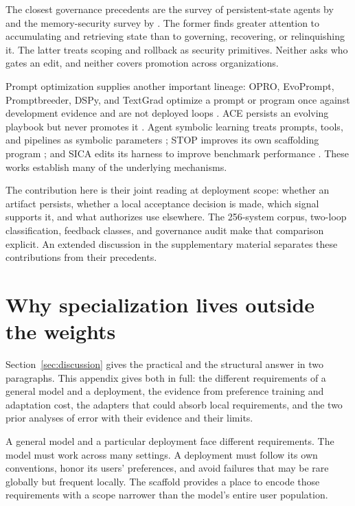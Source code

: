 The closest governance precedents are the survey of persistent-state agents by \citet{ding2026alwayson} and the memory-security survey by \citet{lin2026memorysecurity}. The former finds greater attention to accumulating and retrieving state than to governing, recovering, or relinquishing it. The latter treats scoping and rollback as security primitives. Neither asks who gates an edit, and neither covers promotion across organizations.

Prompt optimization supplies another important lineage: OPRO, EvoPrompt, Promptbreeder, DSPy, and TextGrad optimize a prompt or program once against development evidence and are not deployed loops \citep{yang2023opro, guo2023evoprompt, fernando2023promptbreeder, khattab2023dspy, yuksekgonul2024textgrad}. ACE persists an evolving playbook but never promotes it \citep{ace2025agentic}. Agent symbolic learning treats prompts, tools, and pipelines as symbolic parameters \citep{zhou2024symbolic}; STOP improves its own scaffolding program \citep{zelikman2023stop}; and SICA edits its harness to improve benchmark performance \citep{robeyns2025sica}. These works establish many of the underlying mechanisms.

The contribution here is their joint reading at deployment scope: whether an artifact persists, whether a local acceptance decision is made, which signal supports it, and what authorizes use elsewhere. The 256-system corpus, two-loop classification, feedback classes, and governance audit make that comparison explicit. An extended discussion in the supplementary material separates these contributions from their precedents.

\section{Why specialization lives outside the weights}\label{app:why}

Section~\ref{sec:discussion} gives the practical and the structural answer in two paragraphs. This appendix gives both in full: the different requirements of a general model and a deployment, the evidence from preference training and adaptation cost, the adapters that could absorb local requirements, and the two prior analyses of error with their evidence and their limits.

A general model and a particular deployment face different requirements. The model must work across many settings. A deployment must follow its own conventions, honor its users' preferences, and avoid failures that may be rare globally but frequent locally. The scaffold provides a place to encode those requirements with a scope narrower than the model's entire user population.

